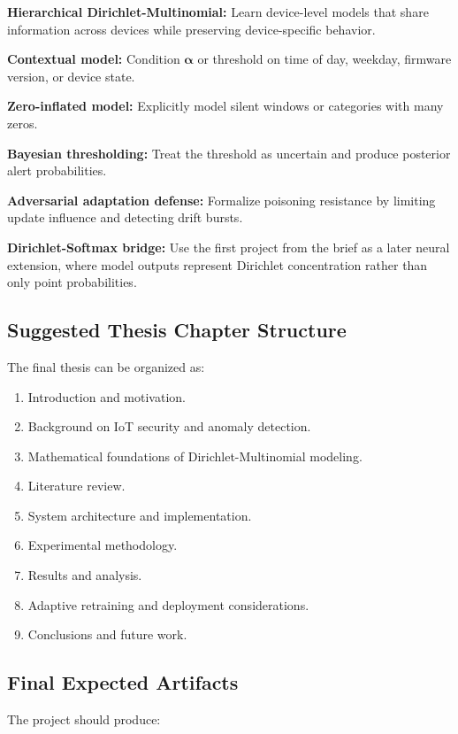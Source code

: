 \documentclass[11pt,a4paper]{article}
\begin{document}
\textbf{Hierarchical Dirichlet-Multinomial:} Learn device-level models that share information across devices while preserving device-specific behavior.

\textbf{Contextual model:} Condition \(\boldsymbol{\alpha}\) or threshold on time of day, weekday, firmware version, or device state.

\textbf{Zero-inflated model:} Explicitly model silent windows or categories with many zeros.

\textbf{Bayesian thresholding:} Treat the threshold as uncertain and produce posterior alert probabilities.

\textbf{Adversarial adaptation defense:} Formalize poisoning resistance by limiting update influence and detecting drift bursts.

\textbf{Dirichlet-Softmax bridge:} Use the first project from the brief as a later neural extension, where model outputs represent Dirichlet concentration rather than only point probabilities.

\subsection{Suggested Thesis Chapter Structure}

The final thesis can be organized as:

\begin{enumerate}
  \item Introduction and motivation.
  \item Background on IoT security and anomaly detection.
  \item Mathematical foundations of Dirichlet-Multinomial modeling.
  \item Literature review.
  \item System architecture and implementation.
  \item Experimental methodology.
  \item Results and analysis.
  \item Adaptive retraining and deployment considerations.
  \item Conclusions and future work.
\end{enumerate}

\subsection{Final Expected Artifacts}

The project should produce:
\end{document}
